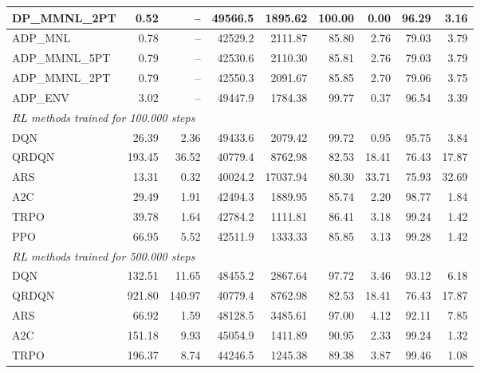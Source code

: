 \begin{samepage}
\begin{center}
\begin{tabular}{l|rr|rr|rr|rr}
    DP\_MMNL\_2PT &     0.52 &    -- &    49566.5 &    1895.62 &  100.00 &    0.00 &   96.29 &    3.16 \\
    \midrule
    ADP\_MNL     &     0.78 &    -- &    42529.2 &    2111.87 &   85.80 &    2.76 &   79.03 &    3.79 \\
    ADP\_MMNL\_5PT &     0.79 &    -- &    42530.6 &    2110.30 &   85.81 &    2.76 &   79.03 &    3.79 \\
    ADP\_MMNL\_2PT &     0.79 &    -- &    42550.3 &    2091.67 &   85.85 &    2.70 &   79.06 &    3.75 \\
    ADP\_ENV     &     3.02 &    -- &    49447.9 &    1784.38 &   99.77 &    0.37 &   96.54 &    3.39 \\
    \midrule
    \multicolumn{9}{l}{\textit{RL methods trained for 100.000 steps}} \\
    \midrule
    DQN          &    26.39 &     2.36 &    49433.6 &    2079.42 &   99.72 &    0.95 &   95.75 &    3.84 \\
    QRDQN        &   193.45 &    36.52 &    40779.4 &    8762.98 &   82.53 &   18.41 &   76.43 &   17.87 \\
    ARS          &    13.31 &     0.32 &    40024.2 &   17037.94 &   80.30 &   33.71 &   75.93 &   32.69 \\
    A2C          &    29.49 &     1.91 &    42494.3 &    1889.95 &   85.74 &    2.20 &   98.77 &    1.84 \\
    TRPO         &    39.78 &     1.64 &    42784.2 &    1111.81 &   86.41 &    3.18 &   99.24 &    1.42 \\
    PPO          &    66.95 &     5.52 &    42511.9 &    1333.33 &   85.85 &    3.13 &   99.28 &    1.42 \\
    \midrule
    \multicolumn{9}{l}{\textit{RL methods trained for 500.000 steps}} \\
    \midrule
    DQN          &   132.51 &    11.65 &    48455.2 &    2867.64 &   97.72 &    3.46 &   93.12 &    6.18 \\
    QRDQN        &   921.80 &   140.97 &    40779.4 &    8762.98 &   82.53 &   18.41 &   76.43 &   17.87 \\
    ARS          &    66.92 &     1.59 &    48128.5 &    3485.61 &   97.00 &    4.12 &   92.11 &    7.85 \\
    A2C          &   151.18 &     9.93 &    45054.9 &    1411.89 &   90.95 &    2.33 &   99.24 &    1.32 \\
    TRPO         &   196.37 &     8.74 &    44246.5 &    1245.38 &   89.38 &    3.87 &   99.46 &    1.08 \\

\end{tabular}
\end{center}
\end{samepage}

